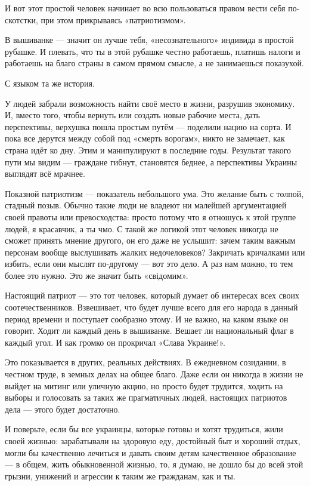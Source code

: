 И вот этот простой человек начинает во всю пользоваться правом вести себя
по-скотстки, при этом прикрываясь «патриотизмом».

В вышиванке --- значит он лучше тебя, «несознательного» индивида в простой
рубашке. И плевать, что ты в этой рубашке честно работаешь, платишь налоги и
работаешь на благо страны в самом прямом смысле, а не занимаешься показухой. 

С языком та же история. 

У людей забрали возможность найти своё место в жизни, разрушив экономику. И,
вместо того, чтобы вернуть или создать новые рабочие места, дать перспективы,
верхушка пошла простым путём --- поделили нацию на сорта. И пока все дерутся
между собой под «смерть ворогам», никто не замечает, как страна идёт ко дну.
Этим и манипулируют в последние годы. Результат такого пути мы видим --- граждане
гибнут, становятся беднее, а перспективы Украины выглядят всё мрачнее. 

Показной патриотизм --- показатель небольшого ума. Это желание быть с толпой,
стадный позыв. Обычно такие люди не владеют ни малейшей аргументацией своей
правоты или превосходства: просто потому что я отношусь к этой группе людей, я
красавчик, а ты чмо. С такой же логикой этот человек никогда не сможет принять
мнение другого, он его даже не услышит: зачем таким важным персонам вообще
выслушивать жалких недочеловеков? Закричать кричалками или избить, если они
мыслят по-другому --- вот это дело. А раз нам можно, то тем более это нужно. Это
же значит быть «свідомим». 

Настоящий патриот --- это тот человек, который думает об интересах всех своих
соотечественников. Взвешивает, что будет лучше всего для его народа в данный
период времени и поступает сообразно этому. И не важно, на каком языке он
говорит. Ходит ли каждый день в вышиванке. Вешает ли национальный флаг в каждый
угол. И как громко он прокричал «Слава Украине!». 


Это показывается в других, реальных действиях. В ежедневном созидании, в
честном труде, в земных делах на общее благо. Даже если он никогда в жизни не
выйдет на митинг или уличную акцию, но просто будет трудится, ходить на выборы
и голосовать за таких же прагматичных людей, настоящих патриотов дела --- этого
будет достаточно. 

И поверьте, если бы все украинцы, которые готовы и хотят трудиться, жили своей
жизнью: зарабатывали на здоровую еду, достойный быт и хороший отдых, могли бы
качественно лечиться и давать своим детям качественное образование --- в общем,
жить обыкновенной жизнью, то, я думаю, не дошло бы до всей этой грызни,
унижений и агрессии к таким же гражданам, как и ты.

